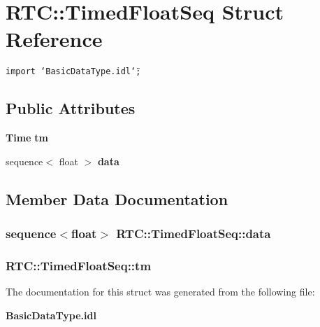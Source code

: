 \section{RTC::Timed\-Float\-Seq Struct Reference}
\label{structRTC_1_1TimedFloatSeq}
{\tt import \char`\"{}Basic\-Data\-Type.idl\char`\"{};}

\subsection*{Public Attributes}
\begin{CompactItemize}
\item 
{\bf Time} {\bf tm}
\item 
sequence$<$ float $>$ {\bf data}
\end{CompactItemize}


\subsection{Member Data Documentation}
\subsubsection{\setlength{\rightskip}{0pt plus 5cm}sequence$<$float$>$ {\bf RTC::Timed\-Float\-Seq::data}}\label{structRTC_1_1TimedFloatSeq_RTC_1_1TimedFloatSeqo1}


\subsubsection{ {\bf RTC::Timed\-Float\-Seq::tm}}\label{structRTC_1_1TimedFloatSeq_RTC_1_1TimedFloatSeqo0}




The documentation for this struct was generated from the following file:\begin{CompactItemize}
\item 
{\bf Basic\-Data\-Type.idl}\end{CompactItemize}
